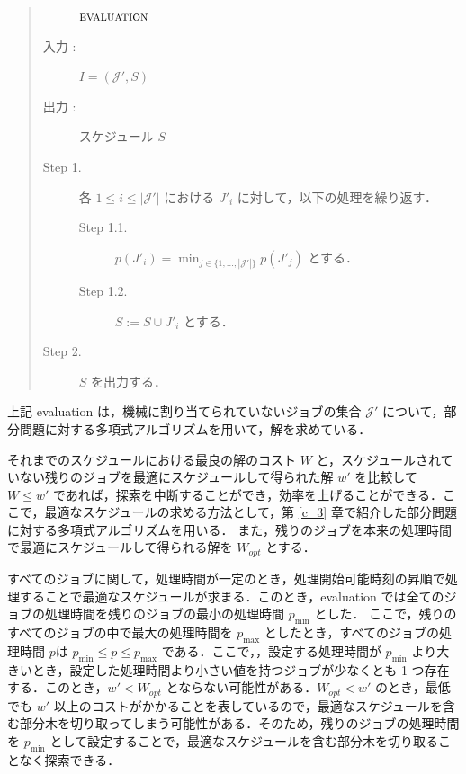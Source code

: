 \documentclass[12pt]{optlab-bachelor}
\begin{document}
\begin{quote}
  \begin{description}
    \item[] ${\mbox {\bf {\sc evaluation}}}$
    \item[入力 :] $I = (\mathcal{J'},S)$
    \item[出力 :] スケジュール $S$
  \end{description}
  \begin{description}
    \item[Step 1.] 各 $1 \le i \le |\mathcal{J}'|$ における $J'_i$ に対して，以下の処理を繰り返す．
    \begin{description}
      \item[Step 1.1.] $p(J'_i) = \displaystyle \min_{j \in \{1,\ldots,|\mathcal{J}'|\}}p(J'_j)$ とする．
      \item[Step 1.2.] $S := S \cup J'_i$ とする．
    \end{description}
    \item[Step 2.] $S$ を出力する．
  \end{description}
\end{quote}

上記 {\sc evaluation} は，機械に割り当てられていないジョブの集合 $\mathcal{J}'$ について，部分問題に対する多項式アルゴリズムを用いて，解を求めている．

それまでのスケジュールにおける最良の解のコスト $W$ と，スケジュールされていない残りのジョブを最適にスケジュールして得られた解 $w'$ を比較して $W \le w'$ であれば，探索を中断することができ，効率を上げることができる．ここで，最適なスケジュールの求める方法として，第 \ref{c_3} 章で紹介した部分問題に対する多項式アルゴリズムを用いる．
また，残りのジョブを本来の処理時間で最適にスケジュールして得られる解を $W_{opt}$ とする．

すべてのジョブに関して，処理時間が一定のとき，処理開始可能時刻の昇順で処理することで最適なスケジュールが求まる．このとき，{\sc evaluation} では全てのジョブの処理時間を残りのジョブの最小の処理時間 $p_{\min}$ とした．
ここで，残りのすべてのジョブの中で最大の処理時間を $p_{\max}$ としたとき，すべてのジョブの処理時間 $p$は $p_{\min} \le p \le p_{\max}$ である．ここで，，設定する処理時間が $p_{\min}$ より大きいとき，設定した処理時間より小さい値を持つジョブが少なくとも 1 つ存在する．このとき，$w' < W_{opt}$ とならない可能性がある．$W_{opt} < w'$ のとき，最低でも $w'$ 以上のコストがかかることを表しているので，最適なスケジュールを含む部分木を切り取ってしまう可能性がある．そのため，残りのジョブの処理時間を $p_{\min}$ として設定することで，最適なスケジュールを含む部分木を切り取ることなく探索できる．
\end{document}
